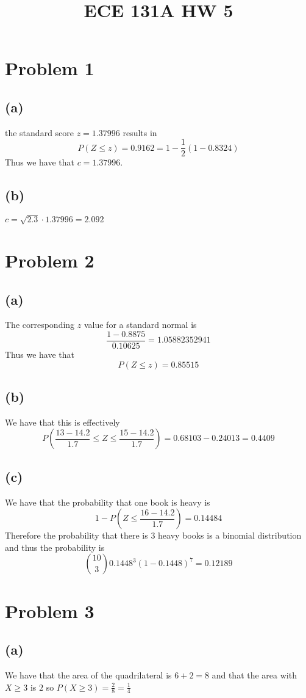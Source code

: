 
\title{ECE 131A HW 5}

\maketitle
\section*{Problem 1}
\subsection*{(a)}
the standard score $z=1.37996$ results in 
$$P(Z\leq z)=0.9162=1-\frac{1}{2}(1-0.8324)$$
Thus we have that $c=\boxed{1.37996}$.
\subsection*{(b)}
$c=\sqrt{2.3}\cdot 1.37996=\boxed{2.092}$
\section*{Problem 2}
\subsection*{(a)}
The corresponding $z$ value for a standard normal is 
$$\frac{1-0.8875}{0.10625}=1.05882352941$$
Thus we have that
$$P(Z\leq z)=0.85515$$
\subsection*{(b)}
We have that this is effectively
$$P\left(\frac{13-14.2}{1.7}\leq Z\leq \frac{15-14.2}{1.7}\right)=0.68103-0.24013=\boxed{0.4409}$$
\subsection*{(c)}
We have that the probability that one book is heavy is 
$$1-P(Z\leq \frac{16-14.2}{1.7})=0.14484$$
Therefore the probability that there is 3 heavy books is a binomial
distribution and thus the probability is 
$${10\choose 3}0.1448^3(1-0.1448)^7=\boxed{0.12189}$$
\section*{Problem 3}
\subsection*{(a)}
We have that the area of the quadrilateral is $6+2=8$ and 
that the area with $X\geq 3$ is $2$ so $P(X\geq 3)=\frac{2}{8}=\boxed{\frac{1}{4}}$

